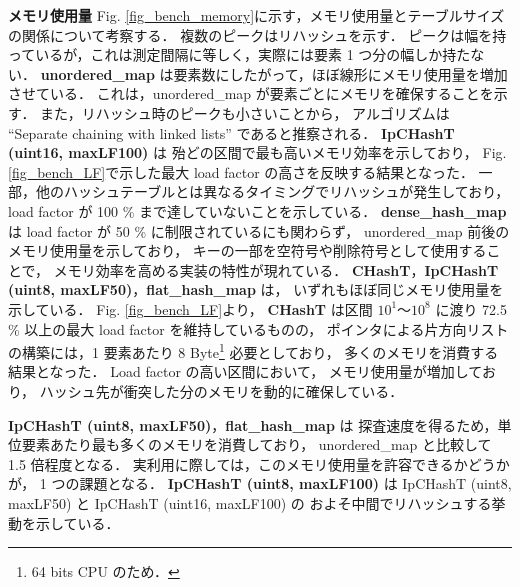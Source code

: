 %
{\bf メモリ使用量}
\samepage\newline\indent
Fig. \ref{fig_bench_memory}に示す，メモリ使用量とテーブルサイズの関係について考察する．
複数のピークはリハッシュを示す．
ピークは幅を持っているが，これは測定間隔に等しく，実際には要素 1 つ分の幅しか持たない．
{\bf unordered\_map} は要素数にしたがって，ほぼ線形にメモリ使用量を増加させている．
これは，unordered\_map が要素ごとにメモリを確保することを示す．
また，リハッシュ時のピークも小さいことから，
アルゴリズムは ``Separate chaining with linked lists'' であると推察される．
{\bf IpCHashT (uint16, maxLF100)} は
殆どの区間で最も高いメモリ効率を示しており，
Fig. \ref{fig_bench_LF}で示した最大 load factor の高さを反映する結果となった．
一部，他のハッシュテーブルとは異なるタイミングでリハッシュが発生しており，
load factor が 100 \% まで達していないことを示している．
{\bf dense\_hash\_map} は
load factor が 50 \% に制限されているにも関わらず，
unordered\_map 前後のメモリ使用量を示しており，
キーの一部を空符号や削除符号として使用することで，
メモリ効率を高める実装の特性が現れている．
{\bf CHashT}，{\bf IpCHashT (uint8, maxLF50)}，{\bf flat\_hash\_map} は，
いずれもほぼ同じメモリ使用量を示している．
Fig. \ref{fig_bench_LF}より，
{\bf CHashT} は区間 $10^1〜10^8$ に渡り 72.5 \% 以上の最大 load factor を維持しているものの，
ポインタによる片方向リストの構築には，1 要素あたり 8 Byte\footnote{64 bits CPU のため．} 必要としており，
多くのメモリを消費する結果となった．
Load factor の高い区間において，
メモリ使用量が増加しており，
ハッシュ先が衝突した分のメモリを動的に確保している．

\noindent
{\bf IpCHashT (uint8, maxLF50)}，{\bf flat\_hash\_map} は
探査速度を得るため，単位要素あたり最も多くのメモリを消費しており，
unordered\_map と比較して 1.5 倍程度となる．
実利用に際しては，このメモリ使用量を許容できるかどうかが，
1 つの課題となる．
{\bf IpCHashT (uint8, maxLF100)} は
IpCHashT (uint8, maxLF50) と IpCHashT (uint16, maxLF100) の
およそ中間でリハッシュする挙動を示している．

